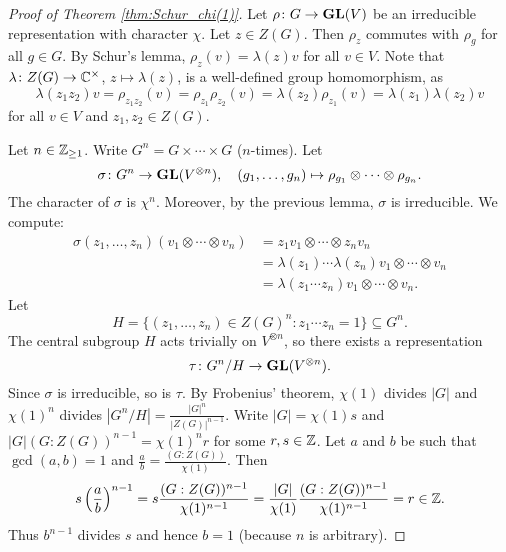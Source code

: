 \begin{proof}[Proof of Theorem \ref{thm:Schur_chi(1)}]
    Let $\rho\colon G\to\mathbf{GL}(V)$ be an irreducible representation 
    with character $\chi$. Let $z\in Z(G)$. Then $\rho_z$ commutes
    with $\rho_g$ for all $g\in G$. By Schur's lemma, 
    $\rho_z(v)=\lambda(z)v$ for all $v\in V$. Note that
    $\lambda\colon Z(G)\to\mathbb{C}^{\times}$, $z\mapsto\lambda(z)$, 
    is a well-defined group homomorphism, as 
    \[
    \lambda(z_1z_2)v=\rho_{z_1z_2}(v)=\rho_{z_1}\rho_{z_2}(v)
    =\lambda(z_2)\rho_{z_1}(v)=\lambda(z_1)\lambda(z_2)v
    \]
    for all $v\in V$ and $z_1,z_2\in Z(G)$. 
    
    Let $n\in\mathbb{Z}_{\geq1}$. Write $G^n=G\times\cdots\times G$ ($n$-times). Let
    \[
    \sigma\colon G^n\to\mathbf{GL}(V^{\otimes n}),\quad
    (g_1,\dots,g_n)\mapsto \rho_{g_1}\otimes\cdots\otimes\rho_{g_n}.
    \]
    The character of $\sigma$ is $\chi^n$. Moreover, by the previous lemma, 
    $\sigma$ is
    irreducible. We compute:
    \begin{align*}   
    \sigma(z_1,\dots,z_n)(v_1\otimes\cdots\otimes v_n)&=z_1v_1\otimes\cdots\otimes z_nv_n\\
    &=\lambda(z_1)\cdots\lambda(z_n)v_1\otimes\cdots\otimes v_n\\
    &=\lambda(z_1\cdots z_n)v_1\otimes\cdots\otimes v_n.
    \end{align*}
    Let 
    \[
    H=\{(z_1,\dots,z_n)\in Z(G)^n:z_1\cdots z_n=1\}\subseteq G^n.
    \]  
    The central subgroup $H$ acts trivially on $V^{\otimes n}$, so there exists
    a representation 
    \[
    \tau\colon G^n/H\to\mathbf{GL}(V^{\otimes n}).
    \]
    Since $\sigma$ is irreducible, so is $\tau$. 
    By Frobenius' theorem, $\chi(1)$ divides $|G|$ 
    and $\chi(1)^n$ divides $|G^n/H|=\frac{|G|^n}{|Z(G)|^{n-1}}$. 
    Write 
    $|G|=\chi(1)s$ and $|G|(G:Z(G))^{n-1}=\chi(1)^nr$ for some $r,s\in\mathbb{Z}$. Let $a$ and $b$ be such that 
    $\gcd(a,b)=1$ and 
    $\frac{a}{b}=\frac{(G:Z(G))}{\chi(1)}$. Then
    \[
    s\left(\frac{a}{b}\right)^{n-1}=s\frac{(G:Z(G))^{n-1}}{\chi(1)^{n-1}}
    =\frac{|G|}{\chi(1)}\frac{(G:Z(G))^{n-1}}{\chi(1)^{n-1}}=r\in\mathbb{Z}.
    \]
    Thus $b^{n-1}$ divides $s$ and hence $b=1$ (because $n$ is arbitrary).  
\end{proof}


